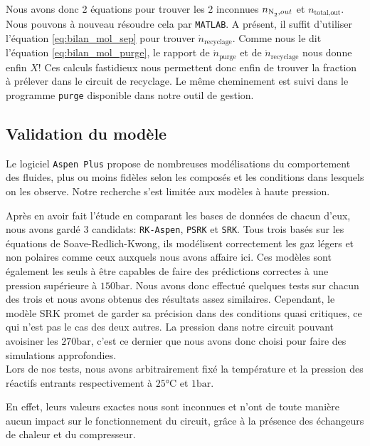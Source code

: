 \documentclass[a4paper, oneside, 12pt]{article}
\begin{document}
Nous avons donc 2 équations pour trouver 
les 2 inconnues $n_{\ce{N2},out}$ et $n_{\text{total,out}}$. 
Nous pouvons à nouveau résoudre cela par \texttt{MATLAB}. 
A présent, il suffit d'utiliser l'équation \ref{eq:bilan_mol_sep} 
pour trouver $\dot{n}_{\text{recyclage}}$. 
Comme nous le dit l'équation \ref{eq:bilan_mol_purge}, 
le rapport de $\dot{n}_{\text{purge}}$ 
et de $\dot{n}_{\text{recyclage}}$ nous donne enfin $X$! 
Ces calculs fastidieux nous permettent donc enfin de trouver la fraction à prélever 
dans le circuit de recyclage. 
Le même cheminement est suivi dans le programme \texttt{purge} 
disponible dans notre outil de gestion.

\subsection{Validation du modèle}

Le logiciel \texttt{Aspen Plus} propose de nombreuses 
modélisations du comportement des fluides, 
plus ou moins fidèles selon les composés et 
les conditions dans lesquels on les observe. 
Notre recherche s'est limitée aux modèles à haute pression. 

Après en avoir fait l'étude en comparant les bases de données de chacun d'eux, 
nous avons gardé 3 candidats: \texttt{RK-Aspen}, \texttt{PSRK} et \texttt{SRK}. 
Tous trois basés sur les équations de Soave-Redlich-Kwong, 
ils modélisent correctement les gaz légers et non polaires 
comme ceux auxquels nous avons affaire ici. 
Ces modèles sont également les seuls à être capables de faire 
des prédictions correctes à une pression supérieure à $150\si{\bar}$. 
Nous avons donc effectué quelques tests sur chacun des trois et nous avons obtenus des résultats assez similaires.
Cependant, le modèle SRK promet de garder sa précision dans des conditions 
quasi critiques, ce qui n'est pas le cas des deux autres. 
La pression dans notre circuit pouvant avoisiner les $270\si{\bar}$, 
c'est ce dernier que nous avons donc choisi pour faire des simulations approfondies.\\
Lors de nos tests, nous avons arbitrairement fixé la température et 
la pression des réactifs entrants respectivement à $25\si{\degreeCelsius}$ et $1\si{\bar}$.

En effet, leurs valeurs exactes nous sont inconnues et n'ont de toute manière 
aucun impact sur le fonctionnement du circuit, grâce à la présence des échangeurs de chaleur 
et du compresseur.
\end{document}
